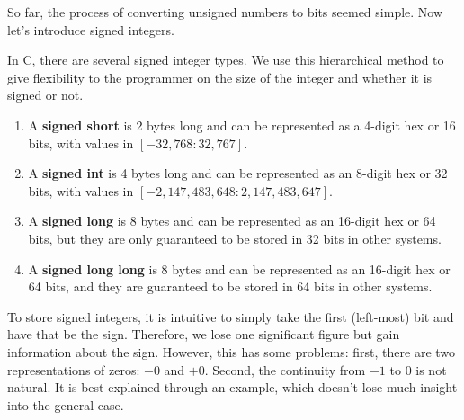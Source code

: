 \documentclass{article}
\begin{document}
    So far, the process of converting unsigned numbers to bits seemed simple. Now let's introduce signed integers. 

    \begin{definition}
      In C, there are several signed integer types. We use this hierarchical method to give flexibility to the programmer on the size of the integer and whether it is signed or not. 
      \begin{enumerate} 
        \item A \textbf{signed short} is 2 bytes long and can be represented as a 4-digit hex or 16 bits, with values in $[-32,768: 32,767]$. 
        \item A \textbf{signed int} is 4 bytes long and can be represented as an 8-digit hex or 32 bits, with values in $[-2,147,483,648: 2,147,483,647]$. 
        \item A \textbf{signed long} is 8 bytes and can be represented as an 16-digit hex or 64 bits, but they are only guaranteed to be stored in 32 bits in other systems. 
        \item A \textbf{signed long long} is 8 bytes and can be represented as an 16-digit hex or 64 bits, and they are guaranteed to be stored in 64 bits in other systems. 
      \end{enumerate}
    \end{definition}

    To store signed integers, it is intuitive to simply take the first (left-most) bit and have that be the sign. Therefore, we lose one significant figure but gain information about the sign. However, this has some problems: first, there are two representations of zeros: $-0$ and $+0$. Second, the continuity from $-1$ to $0$ is not natural. It is best explained through an example, which doesn't lose much insight into the general case. 
\end{document}
